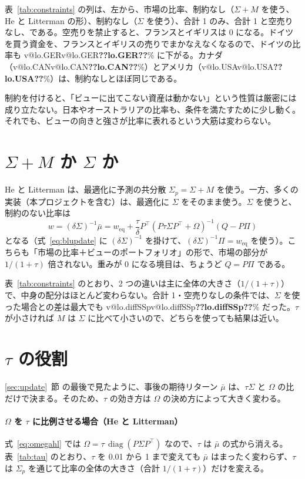 \documentclass[xelatex,ja=standard,jafont=hiragino-pron,a4paper,11pt,openany]{bxjsreport}
\makeatletter
\newcommand{\V}[1]{\ifcsname v@#1\endcsname\csname v@#1\endcsname\else\textbf{??#1??}\fi}
\newcommand{\T}{^{\top}}
\newcommand{\weq}{w_{\mathrm{eq}}}
\newcommand{\mub}{\bar{\mu}}
\newcommand{\Sp}{\Sigma_{p}}
\DeclareMathOperator{\diag}{diag}
\newcommand{\tabref}[1]{表~\ref{#1}}
\newcommand{\secref}[1]{\ref{#1}~節}
\makeatother
\begin{document}
\tabref{tab:constraints} の列は、左から、市場の比率、制約なし（$\Sigma + M$ を使う、He と Litterman の形）、制約なし（$\Sigma$ を使う）、合計 1 のみ、合計 1 と空売りなし、である。空売りを禁止すると、フランスとイギリスは 0 になる。ドイツを買う資金を、フランスとイギリスの売りでまかなえなくなるので、ドイツの比率も \V{lo.GER}\% に下がる。カナダ（\V{lo.CAN}\%）とアメリカ（\V{lo.USA}\%）は、制約なしとほぼ同じである。

制約を付けると、「ビューに出てこない資産は動かない」という性質は厳密には成り立たない。日本やオーストラリアの比率も、条件を満たすために少し動く。それでも、ビューの向きと強さが比率に表れるという大筋は変わらない。

\section{$\Sigma + M$ か $\Sigma$ か}

He と Litterman は、最適化に予測の共分散 $\Sp = \Sigma + M$ を使う。一方、多くの実装（本プロジェクトを含む）は、最適化に $\Sigma$ をそのまま使う。$\Sigma$ を使うと、制約のない比率は
\begin{equation}
w = (\delta\Sigma)^{-1}\mub
= \weq + \frac{\tau}{\delta}P\T\left(P\tau\Sigma P\T + \Omega\right)^{-1}\left(Q - P\Pi\right)
\label{eq:wsigma}
\end{equation}
となる（式~\eqref{eq:blupdate} に $(\delta\Sigma)^{-1}$ を掛けて、$(\delta\Sigma)^{-1}\Pi = \weq$ を使う）。こちらも「市場の比率＋ビューのポートフォリオ」の形で、市場の部分が $1/(1+\tau)$ 倍されない。重みが 0 になる境目は、ちょうど $Q = P\Pi$ である。

\tabref{tab:constraints} のとおり、2 つの違いは主に全体の大きさ（$1/(1 + \tau)$）で、中身の配分はほとんど変わらない。合計 1・空売りなしの条件では、$\Sigma$ を使った場合との差は最大でも \V{lo.diffSSp}\% だった。$\tau$ が小さければ $M$ は $\Sigma$ に比べて小さいので、どちらを使っても結果は近い。

\section{$\tau$ の役割}\label{sec:tau}

\secref{sec:update} の最後で見たように、事後の期待リターン $\mub$ は、$\tau\Sigma$ と $\Omega$ の比だけで決まる。そのため、$\tau$ の効き方は $\Omega$ の決め方によって大きく変わる。

\paragraph{$\Omega$ を $\tau$ に比例させる場合（He と Litterman）}
式~\eqref{eq:omegahl} では $\Omega = \tau\,\diag(P\Sigma P\T)$ なので、$\tau$ は $\mub$ の式から消える。\tabref{tab:tau} のとおり、$\tau$ を 0.01 から 1 まで変えても $\mub$ はまったく変わらず、$\tau$ は $\Sp$ を通じて比率の全体の大きさ（合計 $1/(1 + \tau)$）だけを変える。
\end{document}

